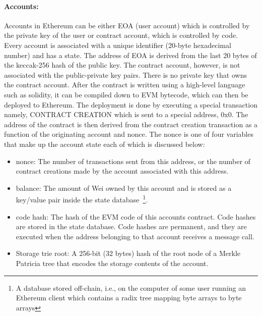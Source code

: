 \paragraph{Accounts:}Accounts in Ethereum can be either \ac{EOA} (user account)
which is controlled by the private key of the user or contract account, which
is controlled by code. Every account is associated with a unique identifier
(20-byte hexadecimal number) and has a state. The address of \ac{EOA} is
derived from the last 20 bytes of the keccak-256 hash of the public key. The
contract account, however, is not associated with the public-private key pairs.
There is no private key that owns the contract account. After the contract is
written using a high-level language such as solidity, it can be compiled down
to EVM bytecode, which can then be deployed to Ethereum. The deployment is done
by executing a special transaction namely, CONTRACT CREATION which is sent to a
special address, 0x0. The address of the contract is then derived from the
contract creation transaction as a function of the originating account and
nonce. The nonce is one of four variables that make up the account state each
of which is discussed below: 
\begin{itemize}
	\item{nonce:} The number of transactions sent from this address, or the
		number of contract creations made by the account associated with this
		address. 
	\item{balance:} The amount of Wei owned by this account and is stored as a
		key/value pair inside the state database~\footnote{A database stored
		off-chain, i.e., on the computer of some user running an Ethereum
		client which contains a radix tree mapping byte arrays to byte arrays}.
	\item{code hash:} The hash of the EVM code of this accounts contract. Code
		hashes are stored in the state database. Code hashes are permanent, and
		they are executed when the address belonging to that account receives a
		message call.  
	\item{Storage trie root:} A 256-bit (32 bytes) hash of the root node of a
		Merkle Patricia tree that encodes the storage contents of the account.  
\end{itemize}
